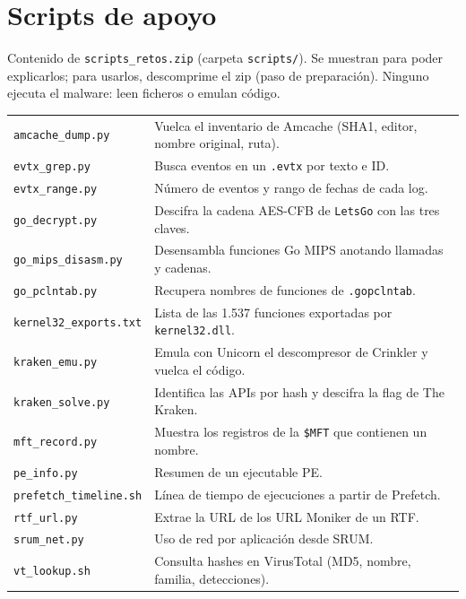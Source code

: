 \documentclass[11pt,a4paper]{article}
\begin{document}
\appendix

\clearpage
\section{Scripts de apoyo}\label{ap:scripts}
Contenido de \texttt{scripts\_retos.zip} (carpeta \texttt{scripts/}). Se muestran para poder explicarlos; para usarlos,
descomprime el zip (paso de preparación). Ninguno ejecuta el malware: leen ficheros o emulan código.

\begin{tabularx}{\linewidth}{@{}lX@{}}
\toprule
\texttt{amcache\_dump.py} & Vuelca el inventario de Amcache (SHA1, editor, nombre original, ruta). \\
\texttt{evtx\_grep.py} & Busca eventos en un \texttt{.evtx} por texto e ID. \\
\texttt{evtx\_range.py} & Número de eventos y rango de fechas de cada log. \\
\texttt{go\_decrypt.py} & Descifra la cadena AES-CFB de \texttt{LetsGo} con las tres claves. \\
\texttt{go\_mips\_disasm.py} & Desensambla funciones Go MIPS anotando llamadas y cadenas. \\
\texttt{go\_pclntab.py} & Recupera nombres de funciones de \texttt{.gopclntab}. \\
\texttt{kernel32\_exports.txt} & Lista de las 1.537 funciones exportadas por \texttt{kernel32.dll}. \\
\texttt{kraken\_emu.py} & Emula con Unicorn el descompresor de Crinkler y vuelca el código. \\
\texttt{kraken\_solve.py} & Identifica las APIs por hash y descifra la flag de The Kraken. \\
\texttt{mft\_record.py} & Muestra los registros de la \texttt{\$MFT} que contienen un nombre. \\
\texttt{pe\_info.py} & Resumen de un ejecutable PE. \\
\texttt{prefetch\_timeline.sh} & Línea de tiempo de ejecuciones a partir de Prefetch. \\
\texttt{rtf\_url.py} & Extrae la URL de los URL Moniker de un RTF. \\
\texttt{srum\_net.py} & Uso de red por aplicación desde SRUM. \\
\texttt{vt\_lookup.sh} & Consulta hashes en VirusTotal (MD5, nombre, familia, detecciones). \\
\bottomrule
\end{tabularx}
\end{document}

